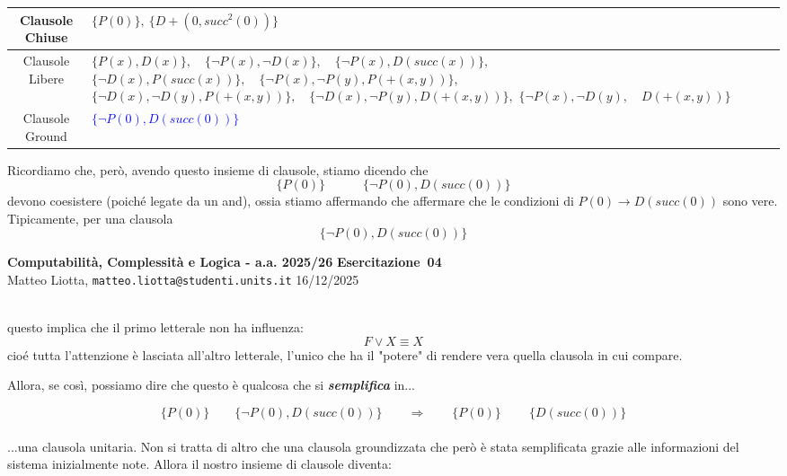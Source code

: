 \documentclass[a4paper,10pt]{article}
\makeatletter
\newcommand{\DocType}{Esercitazione} %
\newcommand{\FullTitle}{\DocType\ \EsercitazioneNum}
\newcommand{\Header}{
\noindent
  \small \textbf{Computabilità, Complessità e Logica - a.a. 2025/26} \hfill \textbf{\FullTitle} \\[0.2cm]
  \scriptsize Matteo Liotta, \texttt{matteo.liotta@studenti.units.it} \hfill \Data \\[0.2cm]
  \noindent\makebox[\linewidth]{\rule{\linewidth}{0.4pt}} \\[0.3cm]}
\newcommand{\NewPageHeader}{
  \vfill
  \noindent\makebox[\linewidth]{\rule{\linewidth}{0.4pt}}
  \newpage
  {\Header}
}
\newcommand{\EsercitazioneNum}{04}
\newcommand{\Data}{16/12/2025}
\makeatother
\begin{document}
\begin{table}[h]
    \centering
    \small 
    \renewcommand{\arraystretch}{1.5} 
    
    \begin{tabularx}{\textwidth}{|c|>{\centering\arraybackslash}X|}
        \hline
        Clausole Chiuse & $\{P(0)\}, \ \{D+(0,succ^2(0))\}$ \\
        \hline
        Clausole Libere & 
            $\{P(x), D(x)\},\quad \{\lnot P(x), \lnot D(x)\},\quad \{\lnot P(x), D(succ(x))\},$\newline
            $\{\lnot D(x), P(succ(x))\},\quad \{\lnot P(x), \lnot P(y), P(+(x, y))\},$\newline
            $\{\lnot D(x), \lnot D(y), P(+(x, y))\},\quad \{\lnot D(x), \lnot P(y), D(+(x, y))\},$\newline
            $\{\lnot P(x), \lnot D(y),\quad D(+(x, y))\}$ 
            \\
        \hline
        Clausole Ground & \textcolor{blue}{$\{\lnot P(0), D(succ(0))\}$} \\
        \hline
    \end{tabularx}
\end{table}

Ricordiamo che, però, avendo questo insieme di clausole, stiamo dicendo che 
$$\{P(0)\} \quad \quad \quad \{\lnot P(0), D(succ(0))\}$$
devono coesistere (poiché legate da un and), ossia stiamo affermando che affermare che le condizioni di $P(0)\rightarrow D(succ(0))$ sono vere. Tipicamente, per una clausola 
$$\{\lnot P(0), D(succ(0))\}$$

\NewPageHeader

questo implica che il primo letterale non ha influenza: 
$$F\lor X\equiv X$$
cioé tutta l'attenzione è lasciata all'altro letterale, l'unico che ha il "potere" di rendere vera quella clausola in cui compare.

Allora, se così, possiamo dire che questo è qualcosa che si \textbf{\textit{semplifica}} in...

$$\{P(0)\} \quad\quad \{\lnot P(0), D(succ(0))\} \quad\quad \Rightarrow \quad\quad \{P(0)\}\ \quad\quad\{D(succ(0))\}$$\\
...una clausola unitaria. Non si tratta di altro che una clausola groundizzata che però è stata semplificata grazie alle informazioni del sistema inizialmente note. Allora il nostro insieme di clausole diventa:
\end{document}
